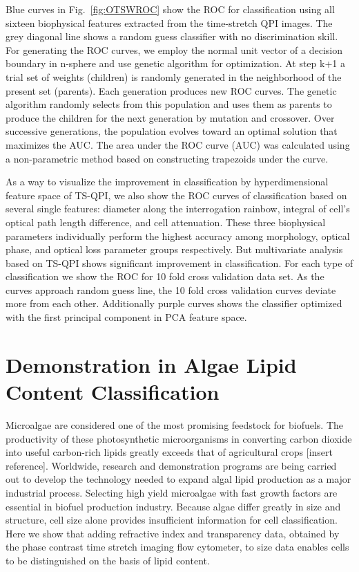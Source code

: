 \documentclass[aps,pra,preprint,superscriptaddress]{revtex4-1}
\begin{document}
Blue curves in Fig.~\ref{fig:OTSWROC} show the ROC for classification using all sixteen biophysical features extracted from the time-stretch QPI images. The grey diagonal line shows a random guess classifier with no discrimination skill. For generating the ROC curves, we employ the normal unit vector of a decision boundary in n-sphere and use genetic algorithm for optimization. At step k+1 a trial set of weights (children) is randomly generated in the neighborhood of the present set (parents). Each generation produces new ROC curves. The genetic algorithm randomly selects from this population and uses them as parents to produce the children for the next generation by mutation and crossover. Over successive generations, the population evolves toward an optimal solution that maximizes the AUC. The area under the ROC curve (AUC) was calculated using a non-parametric method based on constructing trapezoids under the curve.

As a way to visualize the improvement in classification by hyperdimensional feature space of TS-QPI, we also show the ROC curves of classification based on several single features: diameter along the interrogation rainbow, integral of cell’s optical path length difference, and cell attenuation. These three biophysical parameters individually perform the highest accuracy among morphology, optical phase, and optical loss parameter groups respectively. But multivariate analysis based on TS-QPI shows significant improvement in classification. For each type of classification we show the ROC for 10 fold cross validation data set. As the curves approach random guess line, the 10 fold cross validation curves deviate more from each other. Additionally purple curves shows the classifier optimized with the first principal component in PCA feature space.

\section{Demonstration in Algae Lipid Content Classification}

Microalgae are considered one of the most promising feedstock for biofuels. The productivity of these photosynthetic microorganisms in converting carbon dioxide into useful carbon-rich lipids greatly exceeds that of agricultural crops [insert reference]. Worldwide, research and demonstration programs are being carried out to develop the technology needed to expand algal lipid production as a major industrial process. Selecting high yield microalgae with fast growth factors are essential in biofuel production industry. Because algae differ greatly in size and structure, cell size alone provides insufficient information for cell classification. Here we show that adding refractive index and transparency data, obtained by the phase contrast time stretch imaging flow cytometer, to size data enables cells to be distinguished on the basis of lipid content. 
\end{document}
